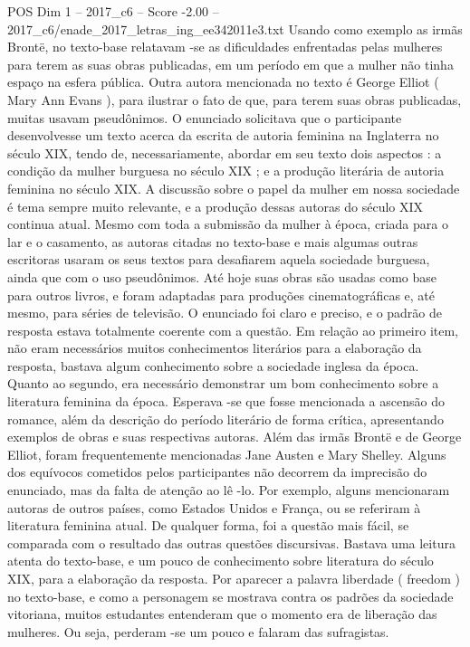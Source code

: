 \begin{textsample}{POS Dim 1 – 2017\_c6 – Score -2.00 – 2017\_c6/enade\_2017\_letras\_ing\_ee342011e3.txt}
Usando como exemplo as irmãs Brontë, no texto-base relatavam -se as dificuldades enfrentadas pelas mulheres para terem as suas obras publicadas, em um período em que a mulher não tinha espaço na esfera pública.
Outra autora mencionada no texto é George Elliot ( Mary Ann Evans ), para ilustrar o fato de que, para terem suas obras publicadas, muitas usavam pseudônimos.
O enunciado solicitava que o participante desenvolvesse um texto acerca da escrita de autoria feminina na Inglaterra no século XIX, tendo de, necessariamente, abordar em seu texto dois aspectos : a condição da mulher burguesa no século XIX ; e a produção literária de autoria feminina no século XIX.
A discussão sobre o papel da mulher em nossa sociedade é tema sempre muito relevante, e a produção dessas autoras do século XIX continua atual.
Mesmo com toda a submissão da mulher à época, criada para o lar e o casamento, as autoras citadas no texto-base e mais algumas outras escritoras usaram os seus textos para desafiarem aquela sociedade burguesa, ainda que com o uso pseudônimos.
Até hoje suas obras são usadas como base para outros livros, e foram adaptadas para produções cinematográficas e, até mesmo, para séries de televisão.
O enunciado foi claro e preciso, e o padrão de resposta estava totalmente coerente com a questão.
Em relação ao primeiro item, não eram necessários muitos conhecimentos literários para a elaboração da resposta, bastava algum conhecimento sobre a sociedade inglesa da época.
Quanto ao segundo, era necessário demonstrar um bom conhecimento sobre a literatura feminina da época.
Esperava -se que fosse mencionada a ascensão do romance, além da descrição do período literário de forma crítica, apresentando exemplos de obras e suas respectivas autoras.
Além das irmãs Brontë e de George Elliot, foram frequentemente mencionadas Jane Austen e Mary Shelley.
Alguns dos equívocos cometidos pelos participantes não decorrem da imprecisão do enunciado, mas da falta de atenção ao lê -lo.
Por exemplo, alguns mencionaram autoras de outros países, como Estados Unidos e França, ou se referiram à literatura feminina atual.
De qualquer forma, foi a questão mais fácil, se comparada com o resultado das outras questões discursivas.
Bastava uma leitura atenta do texto-base, e um pouco de conhecimento sobre literatura do século XIX, para a elaboração da resposta.
Por aparecer a palavra liberdade ( freedom ) no texto-base, e como a personagem se mostrava contra os padrões da sociedade vitoriana, muitos estudantes entenderam que o momento era de liberação das mulheres.
Ou seja, perderam -se um pouco e falaram das sufragistas.

\end{textsample}
